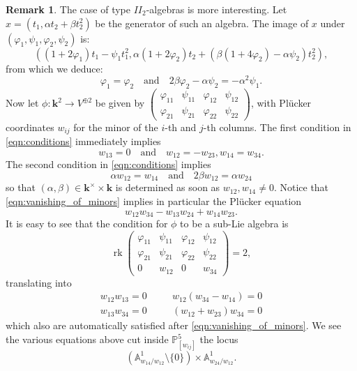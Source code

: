 \documentclass[11pt]{amsart}
\newcommand{\PP}{\mathbb P}
\renewcommand{\k}{\mathbf k}
\renewcommand{\to}{\rightarrow}
\newcommand{\Aaff}{\mathbb A}
\theoremstyle{plain}
\theoremstyle{definition}
\newtheorem{rem}[thm]{Remark}
\begin{document}
\begin{rem}
 The case of type $I\!I_2$-algebras is more interesting. Let $x=(t_1,\alpha t_2+\beta t_2^2)$ be the generator of such an algebra. The image of $x$ under $(\varphi_1,\psi_1,\varphi_2,\psi_2)$ is:
 \[\left((1+2\varphi_1)t_1-\psi_1t_1^2,\alpha(1+2\varphi_2)t_2+(\beta(1+4\varphi_2)-\alpha\psi_2)t_2^2\right),\]
 from which we deduce:
 \begin{equation}\label{eqn:conditions}
 \varphi_1=\varphi_2\quad\text{and}\quad 2\beta\varphi_2-\alpha\psi_2=-\alpha^2\psi_1.
 \end{equation}
 Now let $\phi\colon\k^2\to V^{\oplus 2}$ be given by $\begin{pmatrix} \varphi_{11} & \psi_{11} & \varphi_{12} & \psi_{12} \\ \varphi_{21} & \psi_{21} & \varphi_{22} & \psi_{22}\end{pmatrix}$, with Pl\"ucker coordinates $w_{ij}$ for the minor of the $i$-th and $j$-th columns. The first condition in \eqref{eqn:conditions} immediately implies 
 \begin{equation}\label{eqn:vanishing_of_minors}
  w_{13}=0\quad\text{and}\quad w_{12}=-w_{23},w_{14}=w_{34}.
 \end{equation}
 The second condition in \eqref{eqn:conditions} implies
 \begin{equation}\label{eqn:nonvan_of_minors}
  \alpha w_{12}=w_{14}\quad\text{and}\quad 2\beta w_{12}=\alpha w_{24}
  \end{equation}
 so that $(\alpha,\beta)\in\k^\times\times\k$ is determined as soon as $w_{12},w_{14}\neq 0$. Notice that \eqref{eqn:vanishing_of_minors} implies in particular the Pl\"ucker equation \[w_{12}w_{34}-w_{13}w_{24}+w_{14}w_{23}.\]
 It is easy to see that the condition for $\phi$ to be a sub-Lie algebra is
 \[\operatorname{rk}\begin{pmatrix} \varphi_{11} & \psi_{11} & \varphi_{12} & \psi_{12} \\ \varphi_{21} & \psi_{21} & \varphi_{22} & \psi_{22} \\ 0 & w_{12} & 0 & w_{34} \end{pmatrix}=2,\]
 translating into 
 \begin{align*}
  w_{12}w_{13}=0 & \quad & w_{12}(w_{34}-w_{14})=0 \\ w_{13}w_{34}=0 & \quad & (w_{12}+w_{23})w_{34}=0
 \end{align*}
 which also are automatically satisfied after \eqref{eqn:vanishing_of_minors}. We see the various equations above cut inside $\PP^5_{[w_{ij}]}$ the locus \[(\Aaff^1_{{w_{14}}/{w_{12}}}\setminus\{0\})\times\Aaff^1_{{w_{24}}/{w_{12}}}.\]

\end{rem}
\end{document}
